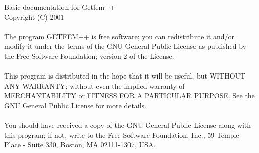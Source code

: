 $\;$\\[8cm]

\pagestyle{empty}
{ \Huge
Basic documentation for {\sc Getfem++}
} \\[8cm]
Copyright (C) 2001\\ \\
The program GETFEM++ is free software; you can redistribute it and/or modify
it under the terms of the GNU General Public License as published by
the Free Software Foundation; version 2 of the License.\\ \\
This program is distributed in the hope that it will be useful,
but WITHOUT ANY WARRANTY; without even the implied warranty of
MERCHANTABILITY or FITNESS FOR A PARTICULAR PURPOSE.  See the
GNU General Public License for more details.\\ \\
You should have received a copy of the GNU General Public License
along with this program; if not, write to the Free Software Foundation,
Inc., 59 Temple Place - Suite 330, Boston, MA  02111-1307, USA.
\newpage



